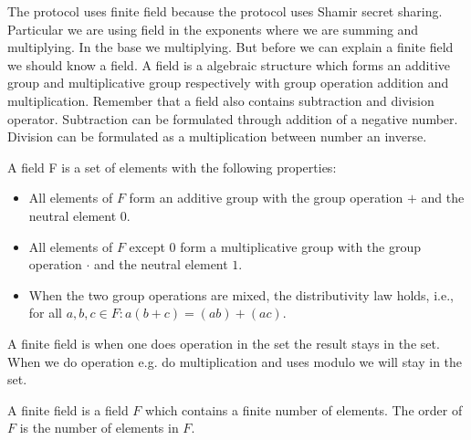  The protocol uses finite field because the protocol uses Shamir secret sharing. Particular we are using field in the exponents where we are summing and multiplying. In the base we multiplying.  But before we can explain a finite field we should know a field. A field is a  algebraic structure which forms an additive group and multiplicative group  respectively with group operation addition and multiplication. Remember that a field also contains subtraction and division operator. Subtraction can be formulated through addition of a negative number. Division can be formulated as a multiplication between number an inverse.  
\begin{defi}
A field F is a set of elements with the following properties:
\begin{itemize}
\item  All elements of $F$ form an additive group with the group operation $+$ and the neutral element $0$.
\item  All elements of $F$ except $0$ form a multiplicative group with the group operation $ \cdot $ and the neutral element $1$.
\item When the two group operations are mixed, the distributivity law holds, i.e., for all $a,b,c \in F: a(b+c) = (ab)+(ac)$.
\end{itemize}
\end{defi}
 A finite field is when one does operation in the set the result stays in the set. When we do operation e.g. do multiplication and uses modulo we will stay in the set.
\begin{defi}
A finite field is a field $F$ which contains a finite number of elements. The order of $F$ is the number of elements in $F$.
\end{defi}

